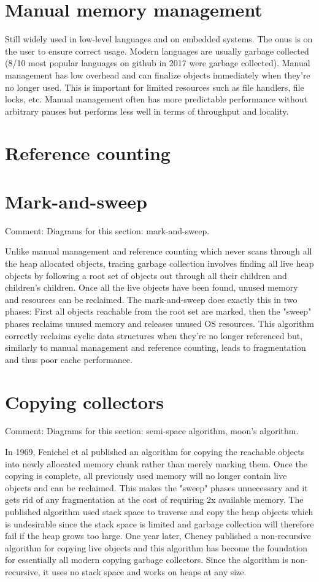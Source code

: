 \documentclass[a4paper,oneside]{memoir}
\newcommand{\makecomment}[1]{{\color{red} Comment: #1}}
\begin{document}

\section{Manual memory management}
Still widely used in low-level languages and on embedded systems.
The onus is on the user to ensure correct usage.
Modern languages are usually garbage collected (8/10 most popular languages on
github\cite{GithubLanguages} in 2017 were garbage collected).
Manual management has low overhead and can finalize objects immediately when
they're no longer used. This is important for limited resources such as file
handlers, file locks, etc.
Manual management often has more predictable performance without arbitrary pauses
but performs less well in terms of throughput and locality.

\section{Reference counting}
\section{Mark-and-sweep}
\makecomment{Diagrams for this section: mark-and-sweep.}

Unlike manual management and reference counting which never scans through all
the heap allocated objects, tracing garbage collection involves finding all live
heap objects by following a root set of objects out through all their children
and children's children. Once all the live objects have been found, unused memory
and resources can be reclaimed.
The mark-and-sweep does exactly this in two phases: First all objects reachable
from the root set are marked, then the "sweep" phases reclaims unused memory and
releases unused OS resources.
This algorithm correctly reclaims cyclic data structures when they're no longer
referenced but, similarly to manual management and reference counting, leads to
fragmentation and thus poor cache performance.

\section{Copying collectors}
\makecomment{Diagrams for this section: semi-space algorithm, moon's algorithm.}

In 1969, Fenichel et al published an algorithm for copying the reachable objects
into newly allocated memory chunk rather than merely marking them.\cite{Fenichel} Once the copying
is complete, all previously used memory will no longer contain live objects
and can be reclaimed. This makes the "sweep" phases unnecessary and it gets rid
of any fragmentation at the cost of requiring 2x available memory. The published
algorithm used stack space to traverse and copy the heap objects which is
undesirable since the stack space is limited and garbage collection will therefore
fail if the heap grows too large. One year later, Cheney published a non-recursive
algorithm for copying live objects and this algorithm has become the foundation
for essentially all modern copying garbage collectors. Since the algorithm is
non-recursive, it uses no stack space and works on heaps at any size.
\end{document}
